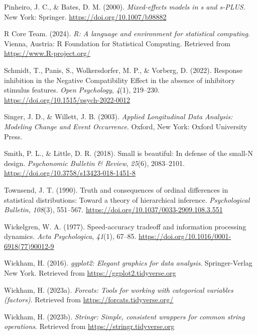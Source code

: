 \documentclass[
  man,floatsintext]{apa6}
\newlength{\cslhangindent}
\newenvironment{CSLReferences}[2] %
 {\begin{list}{}{%
  \setlength{\itemindent}{0pt}
  \setlength{\leftmargin}{0pt}
  \setlength{\parsep}{0pt}
  \ifodd #1
   \setlength{\leftmargin}{\cslhangindent}
   \setlength{\itemindent}{-1\cslhangindent}
  \fi
  \setlength{\itemsep}{#2\baselineskip}}}
 {\end{list}}
\begin{document}
\begin{CSLReferences}{1}{0}
Pinheiro, J. C., \& Bates, D. M. (2000). \emph{Mixed-effects models in s and s-PLUS}. New York: Springer. \url{https://doi.org/10.1007/b98882}

R Core Team. (2024). \emph{R: A language and environment for statistical computing}. Vienna, Austria: R Foundation for Statistical Computing. Retrieved from \url{https://www.R-project.org/}

Schmidt, T., Panis, S., Wolkersdorfer, M. P., \& Vorberg, D. (2022). Response inhibition in the {Negative Compatibility Effect} in the absence of inhibitory stimulus features. \emph{Open Psychology}, \emph{4}(1), 219--230. \url{https://doi.org/10.1515/psych-2022-0012}

Singer, J. D., \& Willett, J. B. (2003). \emph{Applied {Longitudinal Data Analysis}: {Modeling Change} and {Event Occurrence}}. Oxford, New York: Oxford University Press.

Smith, P. L., \& Little, D. R. (2018). Small is beautiful: {In} defense of the small-{N} design. \emph{Psychonomic Bulletin \& Review}, \emph{25}(6), 2083--2101. \url{https://doi.org/10.3758/s13423-018-1451-8}

Townsend, J. T. (1990). Truth and consequences of ordinal differences in statistical distributions: {Toward} a theory of hierarchical inference. \emph{Psychological Bulletin}, \emph{108}(3), 551--567. \url{https://doi.org/10.1037/0033-2909.108.3.551}

Wickelgren, W. A. (1977). Speed-accuracy tradeoff and information processing dynamics. \emph{Acta Psychologica}, \emph{41}(1), 67--85. \url{https://doi.org/10.1016/0001-6918(77)90012-9}

Wickham, H. (2016). \emph{ggplot2: Elegant graphics for data analysis}. Springer-Verlag New York. Retrieved from \url{https://ggplot2.tidyverse.org}

Wickham, H. (2023a). \emph{Forcats: Tools for working with categorical variables (factors)}. Retrieved from \url{https://forcats.tidyverse.org/}

Wickham, H. (2023b). \emph{Stringr: Simple, consistent wrappers for common string operations}. Retrieved from \url{https://stringr.tidyverse.org}


\end{CSLReferences}
\end{document}

